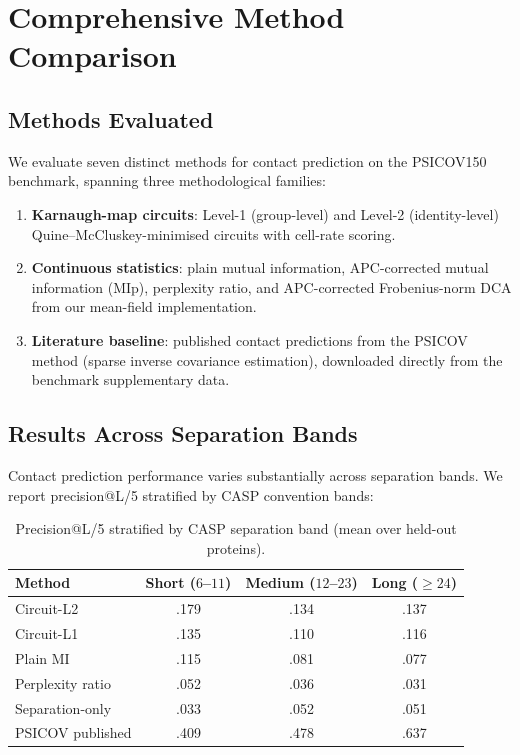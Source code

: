 \section{Comprehensive Method Comparison}
\label{sec:methods-comparison}

\subsection{Methods Evaluated}
We evaluate seven distinct methods for contact prediction on the PSICOV150
benchmark, spanning three methodological families:

\begin{enumerate}[nosep]
	\item \textbf{Karnaugh-map circuits}: Level-1 (group-level) and Level-2
	      (identity-level) Quine--McCluskey-minimised circuits with cell-rate
	      scoring.
	\item \textbf{Continuous statistics}: plain mutual information,
	      APC-corrected mutual information (MIp), perplexity ratio, and
	      APC-corrected Frobenius-norm DCA from our mean-field implementation.
	\item \textbf{Literature baseline}: published contact predictions from the
	      PSICOV method (sparse inverse covariance estimation), downloaded
	      directly from the benchmark supplementary data.
\end{enumerate}

\subsection{Results Across Separation Bands}
Contact prediction performance varies substantially across separation bands.
We report precision@L/5 stratified by CASP convention bands:

\begin{table}[ht]
	\centering
	\caption{Precision@L/5 stratified by CASP separation band (mean over held-out proteins).}
	\label{tab:bands}
	\begin{tabular}{lccc}
		\toprule
		Method           & Short ($6$--$11$) & Medium ($12$--$23$) & Long ($\geq 24$) \\
		\midrule
		Circuit-L2       & .179              & .134                & .137             \\
		Circuit-L1       & .135              & .110                & .116             \\
		Plain MI         & .115              & .081                & .077             \\
		Perplexity ratio & .052              & .036                & .031             \\
		Separation-only  & .033              & .052                & .051             \\
		PSICOV published & .409              & .478                & .637             \\
		\bottomrule
	\end{tabular}
\end{table}

